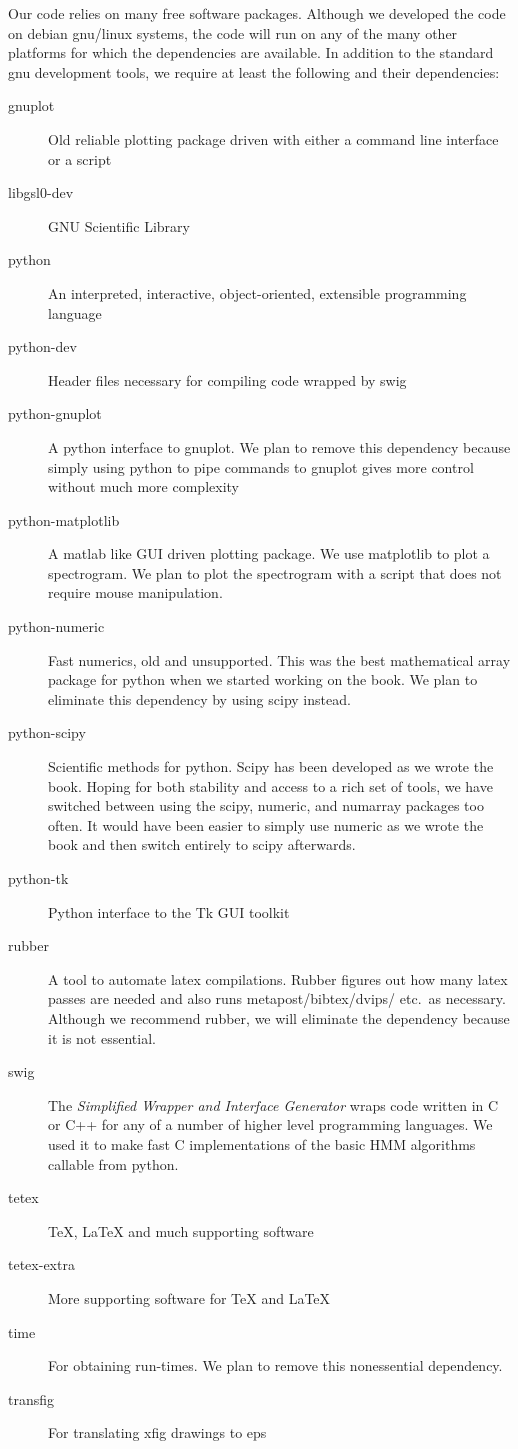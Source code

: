 Our code relies on many free software packages.  Although we developed
the code on debian gnu/linux systems, the code will run on any of the
many other platforms for which the dependencies are available.  In
addition to the standard gnu development tools, we require at least
the following and their dependencies:
  \begin{description}
  \item[gnuplot] Old reliable plotting package driven with either a
    command line interface or a script
  \item[libgsl0-dev] GNU Scientific Library
  \item[python] An interpreted, interactive, object-oriented,
    extensible programming language
  \item[python-dev] Header files necessary for compiling code wrapped
    by swig
  \item[python-gnuplot] A python interface to gnuplot.  We plan to
    remove this dependency because simply using python to pipe commands to
    gnuplot gives more control without much more complexity
  \item[python-matplotlib] A matlab like GUI driven plotting package.
    We use matplotlib to plot a spectrogram.  We plan to plot the
    spectrogram with a script that does not require mouse
    manipulation.
  \item[python-numeric] Fast numerics, old and unsupported.  This was
    the best mathematical array package for python when we started
    working on the book.  We plan to eliminate this dependency by
    using scipy instead.
  \item[python-scipy] Scientific methods for python.  Scipy has been
    developed as we wrote the book.  Hoping for both stability and
    access to a rich set of tools, we have switched between using the
    scipy, numeric, and numarray packages too often.  It would have
    been easier to simply use numeric as we wrote the book and then
    switch entirely to scipy afterwards.
  \item[python-tk] Python interface to the Tk GUI toolkit
  \item[rubber] A tool to automate latex compilations.  Rubber figures
    out how many latex passes are needed and also runs
    metapost/bibtex/dvips/ etc.~as necessary.  Although we recommend
    rubber, we will eliminate the dependency because it is not
    essential.
  \item[swig] The \emph{Simplified Wrapper and Interface Generator}
    wraps code written in C or C++ for any of a number of higher level
    programming languages.  We used it to make fast C implementations
    of the basic HMM algorithms callable from python.
  \item[tetex] TeX, LaTeX and much supporting software
  \item[tetex-extra] More supporting software for TeX and LaTeX
  \item[time] For obtaining run-times.  We plan to remove this
    nonessential dependency.
  \item[transfig] For translating xfig drawings to eps
  \end{description}
